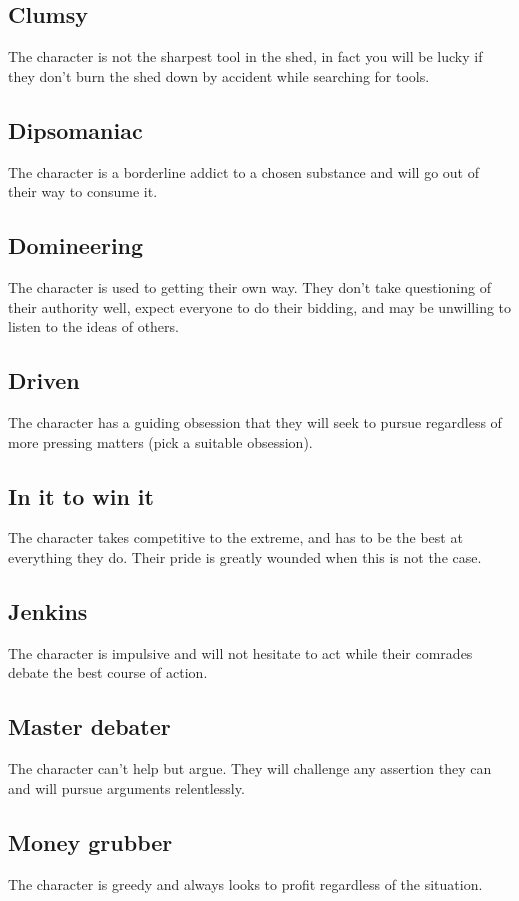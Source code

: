 \documentclass[a4paper,10pt,oneside]{book}
\begin{document}
\subsection{Clumsy}
The character is not the sharpest tool in the shed, in fact you will be lucky if they don't burn the shed down by accident while searching for tools.

\subsection{Dipsomaniac}
The character is a borderline addict to a chosen substance and will go out of their way to consume it.

\subsection{Domineering}
The character is used to getting their own way. They don't take questioning of their authority well, expect everyone to do their bidding, and may be unwilling to listen to the ideas of others.

\subsection{Driven}
The character has a guiding obsession that they will seek to pursue regardless of more pressing matters (pick a suitable obsession).

\subsection{In it to win it}
The character takes competitive to the extreme, and has to be the best at everything they do. Their pride is greatly wounded when this is not the case. 

\subsection{Jenkins}
The character is impulsive and will not hesitate to act while their comrades debate the best course of action.

\subsection{Master debater}
The character can't help but argue. They will challenge any assertion they can and will pursue arguments relentlessly.

\subsection{Money grubber}
The character is greedy and always looks to profit regardless of the situation.
\end{document}
